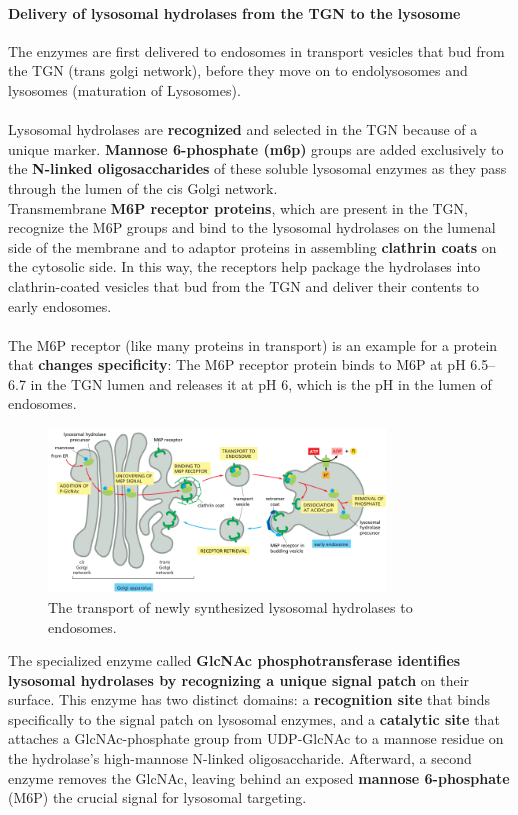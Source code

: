 \documentclass[../main.tex]{subfiles}
\begin{document}
\paragraph{Delivery of lysosomal hydrolases from the TGN to the lysosome}
The enzymes are first delivered to endosomes in transport vesicles that 
bud from the TGN (trans golgi network), before they move on to endolysosomes and lysosomes (maturation of Lysosomes). \\
\\
Lysosomal hydrolases are \textbf{recognized} and selected in the TGN because of a unique marker. \textbf{Mannose 6-phosphate (\gls{m6p})} groups are added exclusively to the \textbf{N-linked oligosaccharides} of these soluble lysosomal enzymes as they pass through the lumen of the cis Golgi network. \\
\indent Transmembrane \textbf{M6P receptor proteins}, which are present in the TGN, recognize the M6P groups and bind to the lysosomal hydrolases on the lumenal side of the membrane and to adaptor proteins in assembling \textbf{clathrin coats} on the cytosolic side. In this way, the receptors help package the hydrolases into clathrin-coated vesicles that bud from the TGN and deliver their contents to early endosomes.\\
\\
The M6P receptor (like many proteins in transport) is an example for a protein that \textbf{changes specificity}: The M6P receptor protein binds to M6P at pH 6.5–6.7 in the TGN lumen and releases it at pH 6, which is the pH in the lumen of endosomes. 

\begin{figure}[H]
	\centering
	\includegraphics[width= 0.8\textwidth]{31}
	\caption{The transport of newly synthesized lysosomal hydrolases to endosomes.}
\end{figure}

The specialized enzyme called \textbf{GlcNAc phosphotransferase identifies lysosomal hydrolases by recognizing a unique signal patch} on their surface. This enzyme has two distinct domains: a \textbf{recognition site} that binds specifically to the signal patch on lysosomal enzymes, and a \textbf{catalytic site} that attaches a GlcNAc-phosphate group from UDP-GlcNAc to a mannose residue on the hydrolase’s high-mannose N-linked oligosaccharide. Afterward, a second enzyme removes the GlcNAc, leaving behind an exposed \textbf{mannose 6-phosphate} (M6P) the crucial signal for lysosomal targeting.
\end{document}
